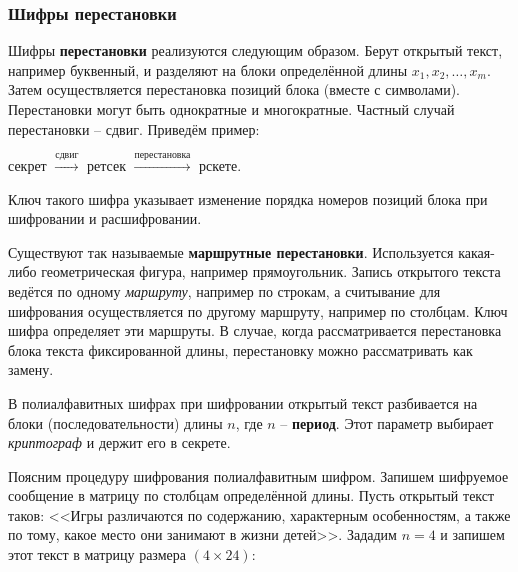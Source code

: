\subsubsection{Шифры перестановки}

Шифры \textbf{перестановки} реализуются следующим образом. Берут открытый текст, например буквенный, и разделяют на блоки определённой длины $x_1, x_2, \dots, x_m$. Затем осуществляется перестановка позиций блока (вместе с символами). Перестановки могут быть однократные и многократные. Частный случай перестановки -- сдвиг. Приведём пример:
\begin{center}
    секрет $\xrightarrow{\text{сдвиг}}$ ретсек $\xrightarrow{\text{перестановка}}$ рскете.
\end{center}
Ключ такого шифра указывает изменение порядка номеров позиций блока при шифровании и расшифровании.

Существуют так называемые \textbf{маршрутные перестановки}. Используется какая-либо геометрическая фигура, например прямоугольник. Запись открытого текста ведётся по одному \emph{маршруту}, например по строкам, а считывание для шифрования осуществляется по другому маршруту, например по столбцам. Ключ шифра определяет эти маршруты.
В случае, когда рассматривается перестановка блока текста фиксированной длины, перестановку можно рассматривать как замену.

В полиалфавитных шифрах при шифровании открытый текст разбивается на блоки (последовательности) длины $n$, где $n$ -- \textbf{период}. Этот параметр выбирает \emph{криптограф} и держит его в секрете.

Поясним процедуру шифрования полиалфавитным шифром. Запишем шифруемое сообщение в матрицу по столбцам определённой длины. Пусть открытый текст таков: <<Игры различаются по содержанию, характерным особенностям, а также по тому, какое место они занимают в жизни детей>>. Зададим $n=4$ и запишем этот текст в матрицу размера $(4 \times 24)$:

\begin{center}  \end{center}

